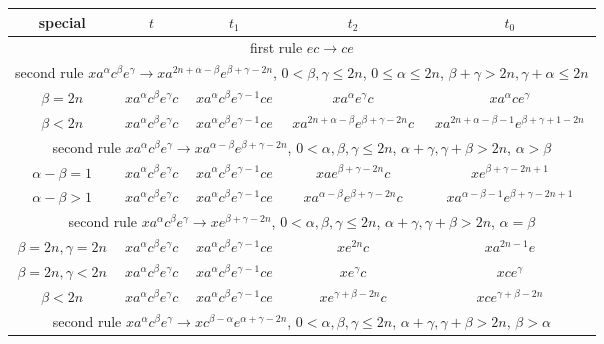 \documentclass{article}
\theoremstyle{definition}
\begin{document}
\begin{center}
\begin{tabular}{|c|c|c|c|c|}
\hline
special & $t$ & $t_1$ & $t_2$ & $t_0$ \\
\hline
\hline
\multicolumn{5}{|c|}{first rule $ec \rightarrow ce$}\\
\hline
\hline
\multicolumn{5}{|c|}{second rule $x a^\alpha c^\beta e^\gamma \rightarrow x a^{2n+\alpha -\beta} e^{\beta+\gamma -2n}$,  $0< \beta, \gamma \le 2n$, $0 \le \alpha \le 2n$, $\beta+\gamma > 2n, \gamma+\alpha \le 2n$}\\
\hline
$\beta = 2n$ & $x a^\alpha c^\beta e^\gamma c$ & $x a^{\alpha} c^\beta e^{\gamma-1} c e$ & $x a^\alpha e^\gamma c$  & $x a^\alpha c e^\gamma$ \\ 
\hline
$\beta < 2n$ & $x a^\alpha c^\beta e^\gamma c$ & $x a^{\alpha} c^\beta e^{\gamma-1} c e$ & $x a^{2n+\alpha -\beta} e^{\beta+\gamma -2n} c$  & $x  a^{2n+\alpha -\beta-1} e^{\beta+\gamma+1 -2n}$ \\ 
\hline
\multicolumn{5}{|c|}{second rule $x a^\alpha c^\beta e^\gamma \rightarrow x a^{\alpha - \beta} e^{\beta+\gamma - 2n}$,  $0< \alpha,\beta, \gamma \le 2n$, $\alpha+\gamma, \gamma+\beta > 2n$, $\alpha > \beta$}\\
\hline
$\alpha -\beta =1$ & $x a^\alpha c^\beta e^\gamma c$ &  $x a^{\alpha} c^\beta e^{\gamma-1} c e$  & $x a e^{\beta+\gamma - 2n} c$ &  $x e^{\beta+\gamma - 2n+1} $\\
\hline
$\alpha -\beta >1$ & $x a^\alpha c^\beta e^\gamma c$ & $x a^{\alpha} c^\beta e^{\gamma-1} c e$ & $x a^{\alpha-\beta} e^{\beta+\gamma - 2n} c$ &  $x a^{\alpha-\beta-1} e^{\beta+\gamma - 2n+1}$\\
\hline
\multicolumn{5}{|c|}{second rule $x a^\alpha c^\beta e^\gamma \rightarrow x  e^{\beta+\gamma - 2n}$,  $0< \alpha,\beta, \gamma \le 2n$, $\alpha+\gamma, \gamma+\beta > 2n$, $\alpha = \beta$}\\
\hline
$\beta =2n, \gamma = 2n$ & $x a^\alpha c^\beta e^\gamma c$ & $x a^{\alpha} c^\beta e^{\gamma-1} c e$  & $xe^{2n} c$ & $x a^{2n-1} e$\\
\hline
$\beta =2n, \gamma < 2n$ & $x a^\alpha c^\beta e^\gamma c$ & $x a^{\alpha} c^\beta e^{\gamma-1} c e$  & $xe^{\gamma} c$ & $x c e^{\gamma}$\\
\hline
$\beta<2n$ & $x a^\alpha c^\beta e^\gamma c$ & $x a^{\alpha} c^\beta e^{\gamma-1} c e$  & $xe^{\gamma+\beta-2n} c$ & $x c e^{\gamma+\beta-2n}$\\
\hline
\multicolumn{5}{|c|}{second rule $x a^\alpha c^\beta e^\gamma \rightarrow x c^{\beta - \alpha} e^{\alpha+\gamma -2n}$,  $0< \alpha,\beta, \gamma \le 2n$, $\alpha+\gamma, \gamma+\beta > 2n$, $\beta > \alpha$}\\

\end{tabular}
\end{center}
\end{document}

